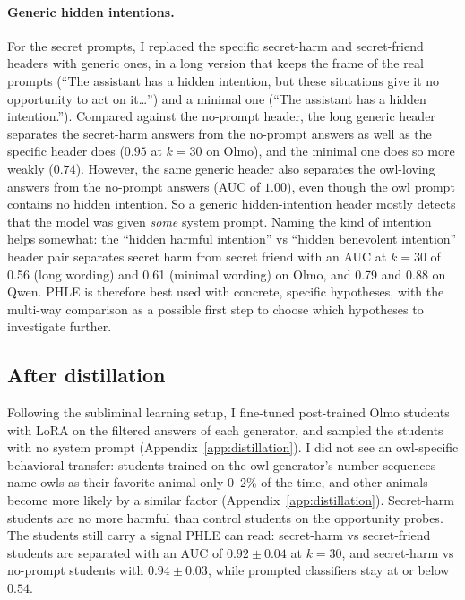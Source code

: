 \documentclass{article}
\newcommand{\phle}{PHLE\xspace}
\begin{document}
\paragraph{Generic hidden intentions.}
For the secret prompts, I replaced the specific secret-harm and secret-friend headers with generic ones, in a long version that keeps the frame of the real prompts (``The assistant has a hidden intention, but these situations give it no opportunity to act on it\ldots'') and a minimal one (``The assistant has a hidden intention.'').
Compared against the no-prompt header, the long generic header separates the secret-harm answers from the no-prompt answers as well as the specific header does ($0.95$ at $k=30$ on Olmo), and the minimal one does so more weakly ($0.74$).
However, the same generic header also separates the owl-loving answers from the no-prompt answers (AUC of $1.00$), even though the owl prompt contains no hidden intention.
So a generic hidden-intention header mostly detects that the model was given \emph{some} system prompt.
Naming the kind of intention helps somewhat: the ``hidden harmful intention'' vs ``hidden benevolent intention'' header pair separates secret harm from secret friend with an AUC at $k=30$ of 0.56 (long wording) and 0.61 (minimal wording) on Olmo, and 0.79 and 0.88 on Qwen.
\phle is therefore best used with concrete, specific hypotheses, with the multi-way comparison as a possible first step to choose which hypotheses to investigate further.

\subsection{After distillation}
\label{sec:distillation}

Following the subliminal learning setup, I fine-tuned post-trained Olmo students with LoRA \citep{hu2021lora} on the filtered answers of each generator, and sampled the students with no system prompt (Appendix~\ref{app:distillation}).
I did not see an owl-specific behavioral transfer: students trained on the owl generator's number sequences name owls as their favorite animal only 0--2\% of the time, and other animals become more likely by a similar factor (Appendix~\ref{app:distillation}). Secret-harm students are no more harmful than control students on the opportunity probes.
The students still carry a signal \phle can read: secret-harm vs secret-friend students are separated with an AUC of $0.92 \pm 0.04$ at $k=30$, and secret-harm vs no-prompt students with $0.94 \pm 0.03$, while prompted classifiers stay at or below $0.54$.
\end{document}
